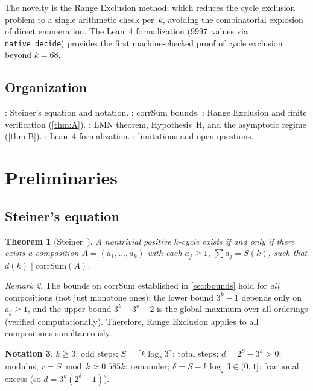 \documentclass[11pt, a4paper]{amsart}
\theoremstyle{plain}
\newtheorem{theorem}{Theorem}[section]
\theoremstyle{definition}
\newtheorem{notation}[theorem]{Notation}
\theoremstyle{remark}
\newtheorem{remark}[theorem]{Remark}
\newcommand{\corrSum}{\mathrm{corrSum}}
\begin{document}
The novelty is the Range Exclusion method, which reduces the
cycle exclusion problem to a single arithmetic check per~$k$,
avoiding the combinatorial explosion of direct enumeration.
The Lean~4 formalization (9997~values via \texttt{native\_decide})
provides the first machine-checked proof of cycle exclusion
beyond $k = 68$.

\subsection{Organization}\label{ssec:organization}

: Steiner's equation and notation.
: corrSum bounds.
: Range Exclusion and finite
verification (\cref{thm:A}).
: LMN theorem, Hypothesis~H, and the
asymptotic regime (\cref{thm:B}).
: Lean~4 formalization.
: limitations and open questions.

\section{Preliminaries}\label{sec:prelim}

\subsection{Steiner's equation}\label{ssec:steiner}

\begin{theorem}[Steiner~\cite{Steiner1977}]\label{thm:steiner}
  A nontrivial positive $k$-cycle exists if and only if
  there exists a composition $A = (a_1, \ldots, a_k)$ with
  each $a_j \geq 1$, $\sum a_j = S(k)$, such that
  $d(k) \mid \corrSum(A)$.
\end{theorem}

\begin{remark}\label{rem:all-compositions}
  The bounds on $\corrSum$ established in \cref{sec:bounds}
  hold for \emph{all} compositions (not just monotone ones):
  the lower bound $3^k - 1$ depends only on $a_j \geq 1$,
  and the upper bound $3^k + 3^r - 2$ is the global maximum
  over all orderings (verified computationally).
  Therefore, Range Exclusion applies to all compositions
  simultaneously.
\end{remark}

\begin{notation}\label{not:main}
  $k \geq 3$: odd steps;
  $S = \lceil k \log_2 3 \rceil$: total steps;
  $d = 2^S - 3^k > 0$: modulus;
  $r = S \bmod k \approx 0.585k$: remainder;
  $\delta = S - k\log_2 3 \in (0, 1]$: fractional excess
  (so $d = 3^k(2^\delta - 1)$).
\end{notation}
\end{document}

